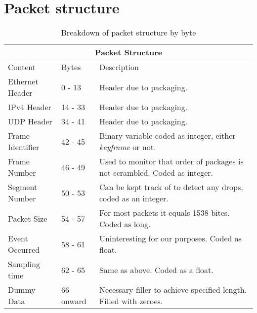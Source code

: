 \chapter{Packet structure}
\thispagestyle{empty}%
\begin{table}[htbp]
\caption{Breakdown of packet structure by byte}
\break
\setlength{\arrayrulewidth}{1mm}
\setlength{\tabcolsep}{12pt}
\renewcommand{\arraystretch}{1.5}
 {
\begin{tabular}{ |p{3cm}|p{1.5cm}|p{7cm}|  }
\hline
\multicolumn{3}{|c|}{Packet Structure} \\
\hline
Content & Bytes & Description \\
\hline
Ethernet Header & 0 - 13 & Header due to packaging. \\
IPv4 Header & 14 - 33 & Header due to packaging. \\
UDP Header & 34 - 41 & Header due to packaging. \\
Frame Identifier & 42 - 45 & Binary variable coded as integer, either \textit{keyframe} or not. \\
Frame Number & 46 - 49 & Used to monitor that order of packages is not scrambled. Coded as integer. \\
Segment Number & 50 - 53 & Can be kept track of to detect any drops, coded as an integer. \\
Packet Size & 54 - 57 & For most packets it equals 1538 bites. Coded as long. \\
Event Occurred & 58 - 61 & Uninteresting for our purposes. Coded as float. \\
Sampling time & 62 - 65 & Same as above. Coded as a float. \\
Dummy Data & 66 onward & Necessary filler to achieve specified length. Filled with zeroes. \\
\hline
\end{tabular}
}
\end{table}